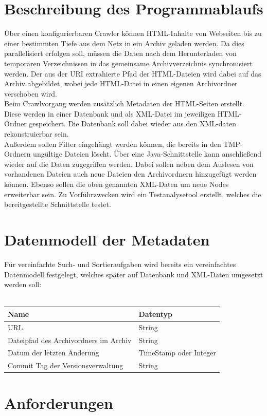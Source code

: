 \chapter{Beschreibung des Programmablaufs}
Über einen konfigurierbaren Crawler können HTML-Inhalte von Webseiten bis zu einer bestimmten Tiefe
aus dem Netz in ein Archiv geladen werden. Da dies parallelisiert erfolgen soll,
müssen die Daten nach dem Herunterladen von temporären Verzeichnissen in das gemeinsame
Archivverzeichnis synchronisiert werden. Der aus der URI extrahierte Pfad der HTML-Dateien wird
dabei auf das Archiv abgebildet, wobei jede HTML-Datei in einen eigenen Archivordner verschoben wird. \\
Beim Crawlvorgang werden zusätzlich Metadaten der HTML-Seiten erstellt. 
Diese werden in einer Datenbank und als XML-Datei im jeweiligen HTML-Ordner gespeichert.
Die Datenbank soll dabei wieder aus den XML-daten rekonstruierbar sein. \\
Außerdem sollen Filter eingehängt werden können, die bereits in den TMP-Ordnern ungültige Dateien löscht.
Über eine Java-Schnittstelle kann anschließend wieder auf die Daten zugegriffen werden.
Dabei sollen neben dem Auslesen von vorhandenen Dateien auch neue Dateien den Archivordnern hinzugefügt werden können.
Ebenso sollen die oben genannten XML-Daten um neue Nodes erweiterbar sein.
Zu Vorführzwecken wird ein Testanalysetool erstellt, welches die bereitgestellte Schnittstelle testet.

\chapter{Datenmodell der Metadaten}
Für vereinfachte Such- und Sortieraufgaben wird bereits ein vereinfachtes Datenmodell festgelegt, welches
später auf Datenbank und XML-Daten umgesetzt werden soll: \\\\
\begin{tabular}{|l|l|}
	\hline
	Name & Datentyp \\
	\hline
	URL & String \\
	Dateipfad des Archivordners im Archiv & String \\
	Datum der letzten Änderung & TimeStamp oder Integer \\
	Commit Tag der Versionsverwaltung & String \\
	\hline
\end{tabular}

\chapter{Anforderungen}

